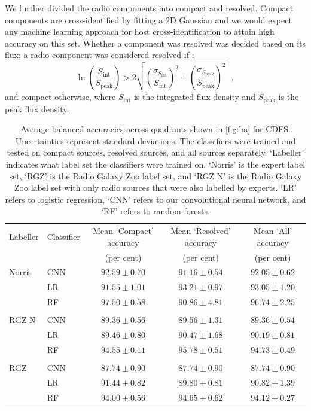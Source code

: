 \documentclass[fleqn,usenatbib,usedcolumn]{mnras}
\begin{document}
    We further divided the radio components into compact and resolved. Compact
    components are cross-identified by fitting a 2D Gaussian \citep[as
    in][]{norris06} and we would expect any machine learning approach for host
    cross-identification to attain high accuracy on this set. Whether a
    component was resolved was decided based on its flux; a radio component was
    considered resolved if \citep{franzen15}:
    \begin{equation}
        \ln \left(
          \frac{S_{\text{int}}}
               {S_{\text{peak}}}
        \right) > 2\sqrt{\left(
          \frac{\sigma_{S_{\text{int}}}}
               {S_{\text{int}}}
        \right)^2 + \left(
          \frac{\sigma_{S_{\text{peak}}}}
               {S_{\text{peak}}}
        \right)^2}\,\,\,\,,
    \end{equation}%
    and compact otherwise, where \(S_{\text{int}}\) is the integrated flux
    density and \(S_{\text{peak}}\) is the peak flux density.

  \begin{table}
    \caption{Average balanced accuracies across quadrants shown in \autoref{fig:ba} for CDFS.
      Uncertainties represent standard deviations.
      The classifiers were trained and tested on compact sources, resolved sources, and all
      sources separately. `Labeller' indicates what label set the classifiers were trained
      on. `Norris' is the expert label set, `RGZ' is the Radio Galaxy Zoo label
      set, and `RGZ N' is the Radio Galaxy Zoo label set with only radio sources
      that were also labelled by experts. `LR' refers to
      logistic regression, `CNN' refers to our convolutional neural network, and
      `RF' refers to random forests.}
    \label{ba:average-accuracies}
    \begin{tabular}{llccc}
\hline
Labeller & Classifier & Mean `Compact' accuracy & Mean `Resolved' accuracy & Mean `All' accuracy\\
 & & (per cent) & (per cent) & (per cent)\\
\hline
Norris & CNN & $92.59 \pm 0.70$ & $91.16 \pm 0.54$ & $92.05 \pm 0.62$\\
 & LR & $91.55 \pm 1.01$ & $93.21 \pm 0.97$ & $93.05 \pm 1.20$\\
 & RF & $97.50 \pm 0.58$ & $90.86 \pm 4.81$ & $96.74 \pm 2.25$\\
 \\
RGZ N & CNN & $89.36 \pm 0.56$ & $89.56 \pm 1.31$ & $89.36 \pm 0.54$\\
 & LR & $89.46 \pm 0.80$ & $90.47 \pm 1.68$ & $90.19 \pm 0.81$\\
 & RF & $94.55 \pm 0.11$ & $95.78 \pm 0.51$ & $94.73 \pm 0.49$\\
 \\
RGZ & CNN & $87.74 \pm 0.90$ & $87.74 \pm 0.90$ & $87.74 \pm 0.90$\\
 & LR & $91.44 \pm 0.82$ & $89.80 \pm 0.81$ & $90.82 \pm 1.39$\\
 & RF & $94.00 \pm 0.56$ & $94.65 \pm 0.62$ & $94.12 \pm 0.27$\\
\hline
\end{tabular}
\end{table}
\end{document}
